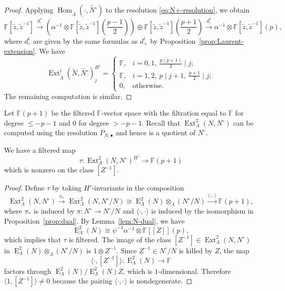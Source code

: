 \documentclass[11pt,a4paper]{article} %
\def\FF{\mathbb{F}}
\def\E{\operatorname{E}}
\def\Ext{\operatorname{Ext}} %
\def\Hom{\operatorname{Hom}}
\begin{document}
\begin{proof}
    Applying $\Hom_{\widetilde{\Lambda}}(\cdot,\widetilde{N^\circ})$ to the resolution \eqref{eq:N+-resolution}, we obtain
    \[
    \FF[\widetilde{z},\widetilde{z}^{-1}]\xrightarrow{d^1_\circ}\left(\alpha^{-1}\otimes\FF[\widetilde{z},\widetilde{z}^{-1}](\frac{p-1}{2})\right)\oplus\FF[\widetilde{z},\widetilde{z}^{-1}](\frac{p+1}{2})\xrightarrow{d^2_\circ}\alpha^{-1}\otimes\FF[\widetilde{z},\widetilde{z}^{-1}](p),
    \]
    where $d^i_\circ$ are given by the same formulas as $d^i_+$ by Proposition~\ref{prop:Laurent-extension}. We have     
    \[
    \Ext_{\widetilde{\Lambda}}^i(\widetilde{N},\widetilde{N^\circ})^{H'}_j=
         \begin{cases}
             \FF,&i=0,1,~\frac{p(p+1)}{2}\mid j;\\
             \FF,&i=1,2,~p\mid j+1,~\frac{p+1}{2}\mid j;\\
             0,&\text{otherwise}.            
         \end{cases}
    \]
    The remaining computation is similar.
\end{proof}

Let $\FF(p+1)$ be the filtered $\FF$-vector space with the filtration equal to $\FF$ for degree $\le-p-1$ and $0$ for degree $>-p-1$. Recall that $\Ext^2_{\Lambda}(N,N^\circ)$ can be computed using the resolution $P_{N,\bullet}$ and hence is a quotient of $N^\circ$.
\begin{lemma}\label{lem:residue}
    We have a filtered map 
    \[
    \tau:\Ext^2_{\Lambda}(N,N^\circ)^{H'}\longrightarrow\FF(p+1)
    \]
    which is nonzero on the class $[Z^{-1}]$.
\end{lemma}

\begin{proof}
    Define $\tau$ by taking $H'$-invariants in the composition
    \[
    \Ext^2_{\Lambda}(N,N^\circ)\xrightarrow{\pi_*}\Ext^2_{\Lambda}(N,N^\circ/N)\cong\E^2_{\Lambda}(N)\otimes_\Lambda (N^\circ/N)\xrightarrow{\langle\cdot,\cdot\rangle}\FF(p+1),
    \]
    where $\pi_*$ is induced by $\pi:N^\circ\to N^\circ/N$ and $\langle\cdot,\cdot\rangle$ is induced by the isomorphism in Proposition~\ref{prop:dual}. By Lemma~\ref{lem:N-dual}, we have 
    \[
    \E^2_{\Lambda}(N)\cong\psi^{-1}\alpha^{-1}\otimes\FF[[Z]](p),
    \]
    which implies that $\tau$ is filtered. The image of the class $[Z^{-1}]\in\Ext^2_{\Lambda}(N,N^\circ)$ in $\E^2_{\Lambda}(N)\otimes_\Lambda (N^\circ/N)$ is $1\otimes Z^{-1}$. Since $Z^{-1}\in N^\circ/N$ is killed by $Z$, the map
    \[
    \langle\cdot,[Z^{-1}]\rangle:\E^2_{\Lambda}(N)\longrightarrow\FF
    \]
    factors through $\E^2_{\Lambda}(N)/\E^2_{\Lambda}(N)Z$, which is $1$-dimensional. Therefore $\langle1,[Z^{-1}]\rangle\ne0$ because the pairing $\langle\cdot,\cdot\rangle$ is nondegenerate.
\end{proof}
\end{document}
